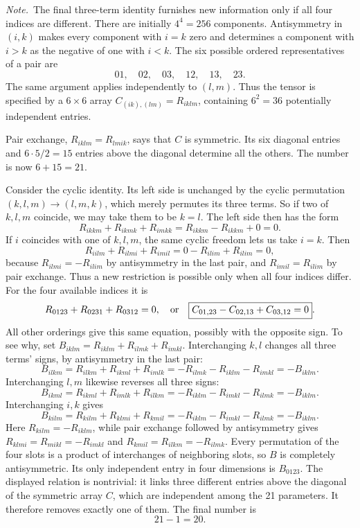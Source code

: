 \emph{Note.}~The final three-term identity furnishes new information only if
all four indices are different.
\solution
There are initially $4^4=256$ components. Antisymmetry in
$(i,k)$ makes every component with $i=k$ zero and determines a component
with $i>k$ as the negative of one with $i<k$. The six possible ordered
representatives of a pair are
\[
01,\quad02,\quad03,\quad12,\quad13,\quad23.
\]
The same argument applies independently to $(l,m)$. Thus the tensor is
specified by a $6\times6$ array $C_{(ik),(lm)}=R_{iklm}$, containing
$6^2=36$ potentially independent entries.

Pair exchange, $R_{iklm}=R_{lmik}$, says that $C$ is symmetric. Its six
diagonal entries and $6\cdot5/2=15$ entries above the diagonal determine
all the others. The number is now $6+15=21$.

Consider the cyclic identity. Its left side is unchanged by the cyclic
permutation $(k,l,m)\to(l,m,k)$, which merely permutes its three terms.
So if two of $k,l,m$ coincide, we may take them to be $k=l$. The left
side then has the form
\[
R_{ikkm}+R_{ikmk}+R_{imkk}=R_{ikkm}-R_{ikkm}+0=0.
\]
If $i$ coincides with one of $k,l,m$, the same cyclic freedom lets us
take $i=k$. Then
\[
R_{iilm}+R_{ilmi}+R_{imil}
=0-R_{ilim}+R_{ilim}=0,
\]
because $R_{ilmi}=-R_{ilim}$ by antisymmetry in the last pair, and
$R_{imil}=R_{ilim}$ by pair exchange.
Thus a new restriction is possible only when all four indices differ.
For the four available indices it is
\[
R_{0123}+R_{0231}+R_{0312}=0,
\quad\hbox{or}\quad
\boxed{C_{01,23}-C_{02,13}+C_{03,12}=0}.
\]
All other orderings give this same equation, possibly with the opposite
sign. To see why, set
$B_{iklm}=R_{iklm}+R_{ilmk}+R_{imkl}$. Interchanging $k,l$ changes all
three terms' signs, by antisymmetry in the last pair:
\[
B_{ilkm}=R_{ilkm}+R_{ikml}+R_{imlk}
=-R_{ilmk}-R_{iklm}-R_{imkl}=-B_{iklm}.
\]
Interchanging $l,m$ likewise reverses all three signs:
\[
B_{ikml}=R_{ikml}+R_{imlk}+R_{ilkm}
=-R_{iklm}-R_{imkl}-R_{ilmk}=-B_{iklm}.
\]
Interchanging $i,k$ gives
\[
B_{kilm}=R_{kilm}+R_{klmi}+R_{kmil}
=-R_{iklm}-R_{imkl}-R_{ilmk}=-B_{iklm}.
\]
Here $R_{kilm}=-R_{iklm}$, while pair exchange followed by antisymmetry
gives $R_{klmi}=R_{mikl}=-R_{imkl}$ and $R_{kmil}=R_{ilkm}=-R_{ilmk}$.
Every permutation of the four slots is a product of interchanges of
neighboring slots, so $B$ is completely antisymmetric. Its only
independent entry in four dimensions is $B_{0123}$. The displayed relation is
nontrivial: it links three different entries above the diagonal of the
symmetric array $C$, which are independent among the 21 parameters. It
therefore removes exactly one of them. The final number is
\[
\boxed{21-1=20}.
\]

